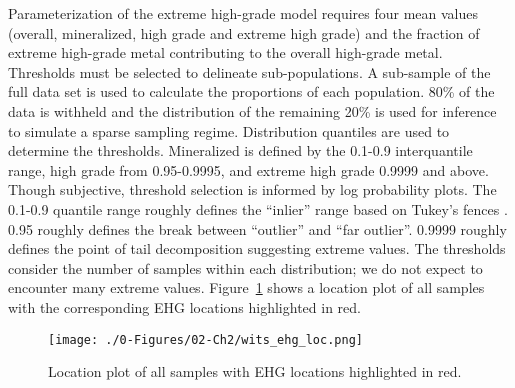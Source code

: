 
Parameterization of the extreme high-grade model requires four mean values (overall, mineralized, high grade and extreme high grade) and the fraction of extreme high-grade metal contributing to the overall high-grade metal. Thresholds must be selected to delineate sub-populations. A sub-sample of the full data set is used to calculate the proportions of each population. 80\% of the data is withheld and the distribution of the remaining 20\% is used for inference to simulate a sparse sampling regime. Distribution quantiles are used to determine the thresholds. Mineralized is defined by the 0.1-0.9 interquantile range, high grade from 0.95-0.9995, and extreme high grade 0.9999 and above. Though subjective, threshold selection is informed by log probability plots. The 0.1-0.9 quantile range roughly defines the ``inlier'' range based on Tukey's fences \citep{tukey1977exploratory}. 0.95 roughly defines the break between ``outlier'' and ``far outlier''. 0.9999 roughly defines the point of tail decomposition suggesting extreme values. The thresholds consider the number of samples within each distribution; we do not expect to encounter many extreme values. Figure~\ref{fig:wits_ehg_loc} shows a location plot of all samples with the corresponding \gls{EHG} locations highlighted in red.

\begin{figure}[htb!]
    \centering
    \texttt{[image: ./0-Figures/02-Ch2/wits\_ehg\_loc.png]}
    \caption{Location plot of all samples with \gls{EHG} locations highlighted in red.}
    \label{fig:wits_ehg_loc}
\end{figure}

